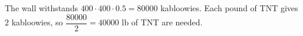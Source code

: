 The wall withstands $400\cdot400\cdot0.5=80000$ kabloowies. Each pound of TNT gives $2$ kabloowies, so $\dfrac{80000}{2}=\boxed{40000\text{ lb}}$ of TNT are needed.
